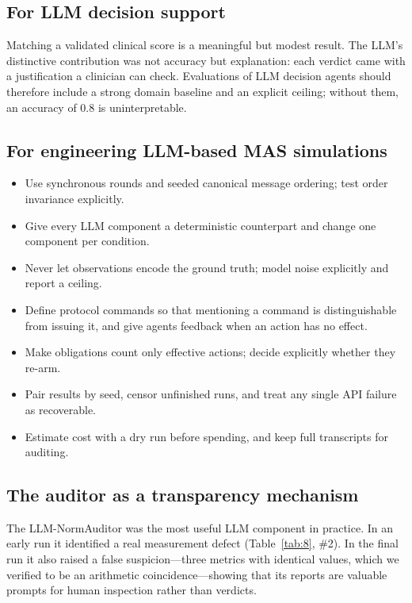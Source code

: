 \documentclass{ieeeaccess}
\begin{document}
\subsection{For LLM decision support}\label{sec:6.2}
Matching a validated clinical score is a meaningful but modest result. The LLM's distinctive contribution was not accuracy but explanation: each verdict came with a justification a clinician can check. Evaluations of LLM decision agents should therefore include a strong domain baseline and an explicit ceiling; without them, an accuracy of 0.8 is uninterpretable.

\subsection{For engineering LLM-based MAS simulations}\label{sec:6.3}
\begin{itemize}
\item Use synchronous rounds and seeded canonical message ordering; test order invariance explicitly.
\item Give every LLM component a deterministic counterpart and change one component per condition.
\item Never let observations encode the ground truth; model noise explicitly and report a ceiling.
\item Define protocol commands so that mentioning a command is distinguishable from issuing it, and give agents feedback when an action has no effect.
\item Make obligations count only effective actions; decide explicitly whether they re-arm.
\item Pair results by seed, censor unfinished runs, and treat any single API failure as recoverable.
\item Estimate cost with a dry run before spending, and keep full transcripts for auditing.
\end{itemize}

\subsection{The auditor as a transparency mechanism}\label{sec:6.4}
The LLM-NormAuditor was the most useful LLM component in practice. In an early run it identified a real measurement defect (Table~\ref{tab:8}, \#2). In the final run it also raised a false suspicion—three metrics with identical values, which we verified to be an arithmetic coincidence—showing that its reports are valuable prompts for human inspection rather than verdicts.
\end{document}
